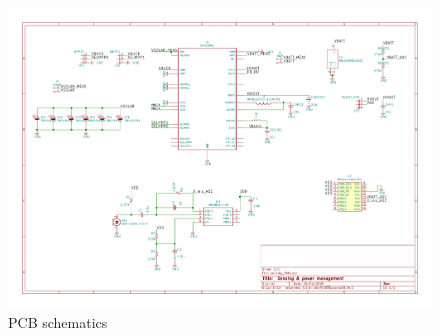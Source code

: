 \documentclass{EPL-master-thesis-covers-EN}
\begin{document}
\begin{figure}[H]
    \centering
    \includegraphics[width=\textwidth]{sensing_PMU_schematic.pdf}
    \caption{PCB schematics}
    \label{fig:PCB_sch}
\end{figure}





\backcoverpage
\end{document}
